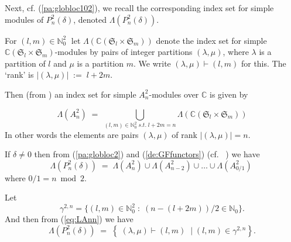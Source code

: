 \documentclass[reqno,10pt,a4paper]{amsart}
\newcommand{\C}{\mathbb{C}}
\newcommand{\N}{\mathbb{N}}
\newcommand{\beq}{\begin{equation}}
\newcommand{\eq}{\end{equation}}
\newcommand{\blue}[1]{\textcolor{blue}{#1}}
\newcommand{\red}[1]{\textcolor{red}{#1}}
\newcommand{\ppm}[1]{\red{#1}}
\newcommand{\ca}[1]{\blue{#1}}
\newcommand{\nk}{n}  %
\newcommand{\Sym}{\mathfrak{S}}
\newcommand{\ignore}[1]{}
\begin{document}
\mdef    \label{pa:Trep}
Next, cf. (\ref{pa:globloc102}),
we recall the   corresponding 
index set {for simple modules} 
of $P_\nk^2(\delta)$,  %
denoted $ \Lambda(P_\nk^2(\delta)) $. 

For $(l,m) \in \N_0^2 \;$
let %
$\Lambda(\C(\Sym_l\times \Sym_m)) $ denote the index set for simple $\C(\Sym_l\times \Sym_m)$-modules by pairs of integer  partitions 
$(
\lambda, \mu)$, %
where $\lambda$ is a partition of $l$ and $\mu$ is a partition $m$.
{We write $ ( \lambda, \mu) \vdash (l,m) $  for this.
The `rank' is 
$|  ( \lambda, \mu) | \; := \; l+2m$}.


Then  
(from \cite[(9.3)]{amm2019tonal})
an index set for simple $A^2_n$-modules over $\C$ %
is given by 
\ignore{{ 
\beq \label{eq:LAn} 
\Lambda(A^2_n)\; =\; 
\bigcup_{\ppm{(\lambda,\mu) \; s.t. [???]} \; |  ( \lambda, \mu) |=n} 
\Lambda(\C(S_{|\lambda|}\times S_{|\mu|}))
\eq 
\ppm{[-this seems wrong. and very confusing. delete?]} 
}}
\begin{equation}
     \label{eq:LAnn}
\Lambda(A^2_n)\; =\; 
\bigcup_{(l,m) \in \N_0^2 \; s.t. \; l+2m=n} 
\Lambda(\C(\Sym_l\times \Sym_m))
\end{equation} 
In other words the elements are pairs $(\lambda,\mu)$ 
of rank $|(\lambda,\mu)| = n$.

If $\delta\neq0$ then 
from (\ref{pa:globloc2}) 
and (\ref{de:GFfunctors}) 
(cf. ~\cite[(5.9)]{amm2019tonal}) 
we have 
\begin{equation}
  \label{eq:Index} 
\Lambda(P_\nk^2(\delta)) \; =\; 
   \Lambda(A^2_n)\cup \Lambda(A^2_{n-2})\cup \dots \cup \Lambda(A^2_{0/1 }) \; %
\end{equation}
where $0/1=n\bmod{2}.$


Let 
\[
\gamma^{2,n}=\{(l,m)\in \N_0^2\;:\; (n-(l+2m))/2\in\N_0\}
.
\]
%
And then from (\ref{eq:LAnn})
we have 
\[
\Lambda(P_\nk^2(\delta)) \; =\;
\left\{ \; 
( \lambda, \mu) \vdash (l,m) \;\; | \; (l,m)\in\gamma^{2,n} \right\}    .
\]
\end{document}
